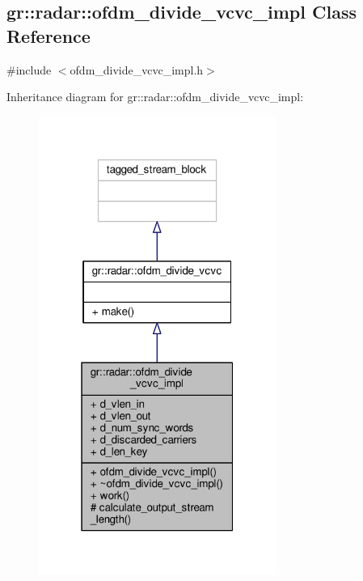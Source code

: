 \subsection{gr\+:\+:radar\+:\+:ofdm\+\_\+divide\+\_\+vcvc\+\_\+impl Class Reference}
\label{classgr_1_1radar_1_1ofdm__divide__vcvc__impl}


{\ttfamily \#include $<$ofdm\+\_\+divide\+\_\+vcvc\+\_\+impl.\+h$>$}



Inheritance diagram for gr\+:\+:radar\+:\+:ofdm\+\_\+divide\+\_\+vcvc\+\_\+impl\+:
\nopagebreak
\begin{figure}[H]
\begin{center}
\leavevmode
\includegraphics[width=220pt]{da/d4a/classgr_1_1radar_1_1ofdm__divide__vcvc__impl__inherit__graph}
\end{center}
\end{figure}


